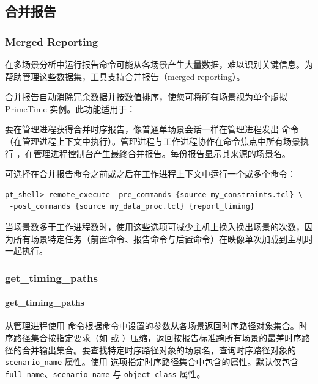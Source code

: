 \subsection{合并报告}
\subsubsection*{Merged Reporting}

在多场景分析中运行报告命令可能从各场景产生大量数据，难以识别关键信息。为帮助管理这些数据集，工具支持合并报告（merged reporting）。

合并报告自动消除冗余数据并按数值排序，使您可将所有场景视为单个虚拟 PrimeTime 实例。此功能适用于：
\begin{center}
 \quad {} \quad {} \quad
{} \quad {} \quad {} \quad {}
\end{center}

要在管理进程获得合并时序报告，像普通单场景会话一样在管理进程发出  命令（在管理进程上下文中执行）。管理进程与工作进程协作在命令焦点中所有场景执行 ，在管理进程控制台产生最终合并报告。每份报告显示其来源的场景名。

可选择在合并报告命令之前或之后在工作进程上下文中运行一个或多个命令：
\begin{lstlisting}
pt_shell> remote_execute -pre_commands {source my_constraints.tcl} \
 -post_commands {source my_data_proc.tcl} {report_timing}
\end{lstlisting}

当场景数多于工作进程数时，使用这些选项可减少主机上换入换出场景的次数，因为所有场景特定任务（前置命令、报告命令与后置命令）在映像单次加载到主机时一起执行。

\subsubsection{get\_timing\_paths}
\paragraph*{get\_timing\_paths}

从管理进程使用  命令根据命令中设置的参数从各场景返回时序路径对象集合。时序路径集合按指定要求（如  或 ）压缩，返回按报告标准跨所有场景的最差时序路径的合并输出集合。要查找特定时序路径对象的场景名，查询时序路径对象的 \texttt{scenario\_name} 属性。使用  选项指定时序路径集合中包含的属性。默认仅包含 \texttt{full\_name}、\texttt{scenario\_name} 与 \texttt{object\_class} 属性。

